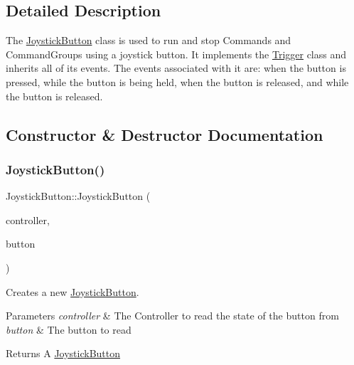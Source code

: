 \subsection{Detailed Description}
The \mbox{\hyperlink{classlib_iterative_robot_1_1_joystick_button}{Joystick\+Button}} class is used to run and stop Commands and Command\+Groups using a joystick button. It implements the \mbox{\hyperlink{classlib_iterative_robot_1_1_trigger}{Trigger}} class and inherits all of its events. The events associated with it are\+: when the button is pressed, while the button is being held, when the button is released, and while the button is released. 

\subsection{Constructor \& Destructor Documentation}
\mbox{\label{classlib_iterative_robot_1_1_joystick_button_af34169116bcab8a1b5868dddc745e5ec}} 
\subsubsection{\texorpdfstring{JoystickButton()}{JoystickButton()}}
{\footnotesize\ttfamily Joystick\+Button\+::\+Joystick\+Button (\begin{DoxyParamCaption}\item[{pros\+::\+Controller $\ast$}]{controller,  }\item[{pros\+::controller\+\_\+digital\+\_\+e\+\_\+t}]{button }\end{DoxyParamCaption})}



Creates a new \mbox{\hyperlink{classlib_iterative_robot_1_1_joystick_button}{Joystick\+Button}}. 


\begin{DoxyParams}{Parameters}
{\em controller} & The Controller to read the state of the button from \\
\hline
{\em button} & The button to read \\
\hline
\end{DoxyParams}
\begin{DoxyReturn}{Returns}
A \mbox{\hyperlink{classlib_iterative_robot_1_1_joystick_button}{Joystick\+Button}} 
\end{DoxyReturn}


